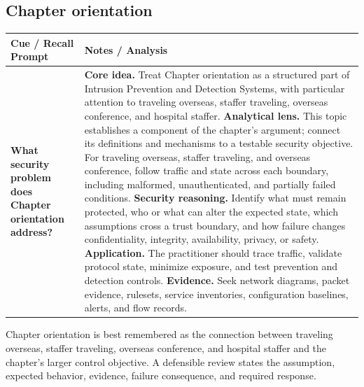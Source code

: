 \documentclass[11pt]{article}
\newcommand{\CornellHeader}{%
\rowcolor{Navy}\color{white}\bfseries Cue / Recall Prompt & \color{white}\bfseries Notes / Analysis\\\hline}
\newcommand{\CornellRow}[2]{%
\cellcolor{CueGray}\RaggedRight\textbf{#1} & \RaggedRight #2\\\hline}
\begin{document}
\subsection*{Chapter orientation}
\begin{longtable}{>{\RaggedRight\arraybackslash}p{}|>{\RaggedRight\arraybackslash}p{}}
\CornellHeader
\CornellRow{What security problem does Chapter orientation address?}{\textbf{Core idea.} Treat Chapter orientation as a structured part of Intrusion Prevention and Detection Systems, with particular attention to traveling overseas, staffer traveling, overseas conference, and hospital staffer. \textbf{Analytical lens.} This topic establishes a component of the chapter's argument; connect its definitions and mechanisms to a testable security objective. For traveling overseas, staffer traveling, and overseas conference, follow traffic and state across each boundary, including malformed, unauthenticated, and partially failed conditions. \textbf{Security reasoning.} Identify what must remain protected, who or what can alter the expected state, which assumptions cross a trust boundary, and how failure changes confidentiality, integrity, availability, privacy, or safety. \textbf{Application.} The practitioner should trace traffic, validate protocol state, minimize exposure, and test prevention and detection controls. \textbf{Evidence.} Seek network diagrams, packet evidence, rulesets, service inventories, configuration baselines, alerts, and flow records.}
\end{longtable}
\begin{topicsummary}
Chapter orientation is best remembered as the connection between traveling overseas, staffer traveling, overseas conference, and hospital staffer and the chapter's larger control objective. A defensible review states the assumption, expected behavior, evidence, failure consequence, and required response.
\end{topicsummary}
\end{document}
